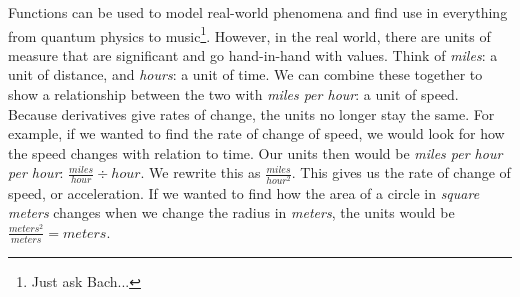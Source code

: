 \documentclass[../revisedmain.tex]{subfiles}
\begin{document}
	Functions can be used to model real-world phenomena and find use in everything from quantum physics to music\footnote{Just ask Bach...}. However, in the real world, there are units of measure that are significant and go hand-in-hand with values. Think of \textit{miles}: a unit of distance, and \textit{hours}: a unit of time. We can combine these together to show a relationship between the two with \textit{miles per hour}: a  unit of speed. Because derivatives give rates of change, the units no longer stay the same. For example, if we wanted to find the rate of change of speed, we would look for how the speed changes with relation to time. Our units then would be \textit{miles per hour per hour}: $\displaystyle\frac{miles}{hour}\div hour$. We rewrite this as $\displaystyle\frac{miles}{hour^2}$. This gives us the rate of change of speed, or acceleration. If we wanted to find how the area of a circle in \textit{square meters} changes when we change the radius in \textit{meters}, the units would be $\displaystyle\frac{meters^2}{meters} = meters$.
\end{document}
